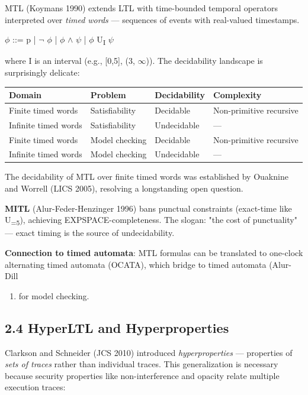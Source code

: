 \documentclass[11pt]{article}
\begin{document}
MTL (Koymans 1990) extends LTL with time-bounded temporal operators interpreted
over \emph{timed words} --- sequences of events with real-valued timestamps.

\(\phi\) ::= p | \(\neg{}\) \(\phi\) | \(\phi\) \(\land\) \(\psi\) | \(\phi\) U\textsubscript{I} \(\psi\)

where I is an interval (e.g., [0,5], (3, \(\infty\))). The decidability landscape
is surprisingly delicate:

\begin{center}
\begin{tabular}{llll}
Domain & Problem & Decidability & Complexity\\
\hline
Finite timed words & Satisfiability & Decidable & Non-primitive recursive\\
Infinite timed words & Satisfiability & Undecidable & ---\\
Finite timed words & Model checking & Decidable & Non-primitive recursive\\
Infinite timed words & Model checking & Undecidable & ---\\
\end{tabular}
\end{center}

The decidability of MTL over finite timed words was established by Ouaknine and
Worrell (LICS 2005), resolving a longstanding open question.

\textbf{MITL} (Alur-Feder-Henzinger 1996) bans punctual constraints (exact-time like
U\textsubscript{=5}), achieving EXPSPACE-completeness. The slogan: "the cost of punctuality"
--- exact timing is the source of undecidability.

\textbf{Connection to timed automata}: MTL formulas can be translated to one-clock
alternating timed automata (OCATA), which bridge to timed automata (Alur-Dill
\begin{enumerate}
\item for model checking.
\end{enumerate}
\subsection{2.4 HyperLTL and Hyperproperties}
\label{sec:org8d9c44e}

Clarkson and Schneider (JCS 2010) introduced \emph{hyperproperties} --- properties
of \emph{sets of traces} rather than individual traces. This generalization is
necessary because security properties like non-interference and opacity relate
multiple execution traces:
\end{document}
